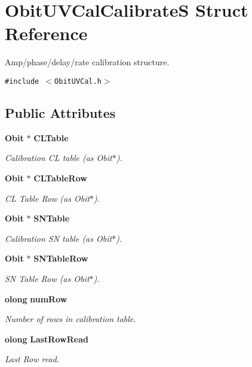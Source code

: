\section{Obit\-UVCal\-Calibrate\-S Struct Reference}
\label{structObitUVCalCalibrateS}
Amp/phase/delay/rate calibration structure.  


{\tt \#include $<$Obit\-UVCal.h$>$}

\subsection*{Public Attributes}
\begin{CompactItemize}
\item 
{\bf Obit} $\ast$ {\bf CLTable}
\begin{CompactList}\small\item\em Calibration CL table (as Obit$\ast$). \item\end{CompactList}\item 
{\bf Obit} $\ast$ {\bf CLTable\-Row}
\begin{CompactList}\small\item\em CL Table Row (as Obit$\ast$). \item\end{CompactList}\item 
{\bf Obit} $\ast$ {\bf SNTable}
\begin{CompactList}\small\item\em Calibration SN table (as Obit$\ast$). \item\end{CompactList}\item 
{\bf Obit} $\ast$ {\bf SNTable\-Row}
\begin{CompactList}\small\item\em SN Table Row (as Obit$\ast$). \item\end{CompactList}\item 
{\bf olong} {\bf num\-Row}
\begin{CompactList}\small\item\em Number of rows in calibration table. \item\end{CompactList}\item 
{\bf olong} {\bf Last\-Row\-Read}
\begin{CompactList}\small\item\em Last Row read. \item\end{CompactList}\item 

\end{CompactItemize}
